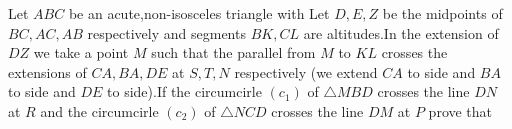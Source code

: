 Let $ABC$ be an acute,non-isosceles triangle with Let $D,E,Z$ be the midpoints of $BC,AC,AB$ respectively and segments $BK,CL$ are altitudes.In the extension of $DZ$ we take a point $M$ such that the parallel from $M$ to $KL$ crosses the extensions of $CA,BA,DE$ at $S,T,N$ respectively (we extend $CA$ to side and $BA$ to side and $DE$ to side).If the circumcirle $(c_{1})$ of $\triangle{MBD}$ crosses the line $DN$ at $R$ and the circumcirle $(c_{2})$ of $\triangle{NCD}$ crosses the line $DM$ at $P$ prove that 